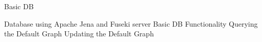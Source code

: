 \begin{frame}{Basic DB}
	\begin{outline}
 \1 Database using Apache Jena and Fuseki server
   \1 Basic DB Functionality
     \2  Querying the Default Graph
     \2 Updating the Default Graph
     
\end{outline}
\end{frame}
